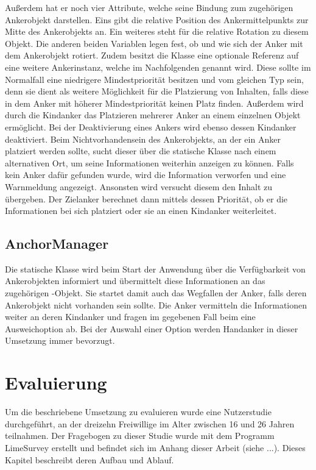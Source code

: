 			Außerdem hat er noch vier Attribute, welche seine Bindung zum zugehörigen Ankerobjekt darstellen. Eins gibt die relative Position des Ankermittelpunkts zur Mitte des Ankerobjekts an. Ein weiteres steht für die relative Rotation zu diesem Objekt. Die anderen beiden Variablen legen fest, ob und wie sich der Anker mit dem Ankerobjekt rotiert.
			Zudem besitzt die Klasse eine optionale Referenz auf eine weitere Ankerinstanz, welche im Nachfolgenden  genannt wird. Diese sollte im Normalfall eine niedrigere Mindestpriorität besitzen und vom gleichen Typ sein, denn sie dient als weitere Möglichkeit für die Platzierung von Inhalten, falls diese in dem Anker mit höherer Mindestpriorität keinen Platz finden. Außerdem wird durch die Kindanker das Platzieren mehrerer Anker an einem einzelnen Objekt ermöglicht. Bei der Deaktivierung eines Ankers wird ebenso dessen Kindanker deaktiviert.
			Beim Nichtvorhandensein des Ankerobjekts, an der ein Anker platziert werden sollte, sucht dieser über die statische Klasse  nach einem alternativen Ort, um seine Informationen weiterhin anzeigen zu können.
			Falls kein Anker dafür gefunden wurde, wird die Information verworfen und eine Warnmeldung angezeigt. Ansonsten wird versucht diesem den Inhalt zu übergeben. Der Zielanker berechnet dann mittels dessen Priorität, ob er die Informationen bei sich platziert oder sie an einen Kindanker weiterleitet.
		
		\subsection{AnchorManager}
			Die statische Klasse  wird beim Start der Anwendung über die Verfügbarkeit von Ankerobjekten informiert und übermittelt diese Informationen an das zugehörigen -Objekt. Sie startet damit auch das Wegfallen der Anker, falls deren Ankerobjekt nicht vorhanden sein sollte. Die Anker vermitteln die Informationen weiter an deren Kindanker und fragen im gegebenen Fall beim  eine Ausweichoption ab. Bei der Auswahl einer Option werden Handanker in dieser Umsetzung immer bevorzugt.
			
	\section{Evaluierung}
		Um die beschriebene Umsetzung zu evaluieren wurde eine Nutzerstudie durchgeführt, an der dreizehn Freiwillige im Alter zwischen 16 und 26 Jahren teilnahmen. Der Fragebogen zu dieser Studie wurde mit dem Programm LimeSurvey erstellt und befindet sich im Anhang dieser Arbeit (siehe ...). Dieses Kapitel beschreibt deren Aufbau und Ablauf.
	
